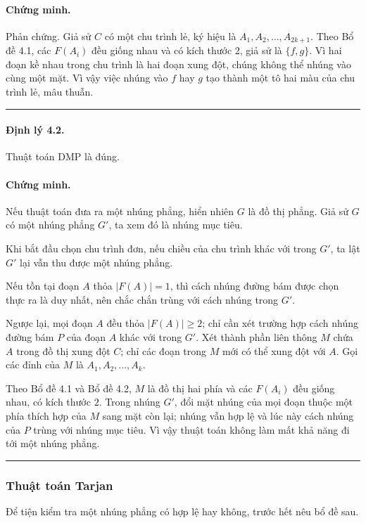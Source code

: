 \documentclass[11pt]{article}
\begin{document}
\paragraph{Chứng minh.}
Phản chứng. Giả sử $C$ có một chu trình lẻ, ký hiệu là
$A_1,A_2,\ldots,A_{2k+1}$. Theo Bổ đề 4.1, các $F(A_i)$ đều giống nhau và có
kích thước $2$, giả sử là $\{f,g\}$. Vì hai đoạn kề nhau trong chu trình là hai
đoạn xung đột, chúng không thể nhúng vào cùng một mặt. Vì vậy việc nhúng vào
$f$ hay $g$ tạo thành một tô hai màu của chu trình lẻ, mâu thuẫn.
\hfill\rule{0.55em}{0.55em}

\paragraph{Định lý 4.2.}
Thuật toán DMP là đúng.

\paragraph{Chứng minh.}
Nếu thuật toán đưa ra một nhúng phẳng, hiển nhiên $G$ là đồ thị phẳng. Giả sử
$G$ có một nhúng phẳng $G'$, ta xem đó là nhúng mục tiêu.

Khi bắt đầu chọn chu trình đơn, nếu chiều của chu trình khác với trong $G'$, ta
lật $G'$ lại vẫn thu được một nhúng phẳng.

Nếu tồn tại đoạn $A$ thỏa $|F(A)|=1$, thì cách nhúng đường bám được chọn thực
ra là duy nhất, nên chắc chắn trùng với cách nhúng trong $G'$.

Ngược lại, mọi đoạn $A$ đều thỏa $|F(A)|\ge 2$; chỉ cần xét trường hợp cách
nhúng đường bám $P$ của đoạn $A$ khác với trong $G'$. Xét thành phần liên thông
$M$ chứa $A$ trong đồ thị xung đột $C$; chỉ các đoạn trong $M$ mới có thể xung
đột với $A$. Gọi các đỉnh của $M$ là $A_1,A_2,\ldots,A_k$.

Theo Bổ đề 4.1 và Bổ đề 4.2, $M$ là đồ thị hai phía và các $F(A_i)$ đều giống
nhau, có kích thước $2$. Trong nhúng $G'$, đổi mặt nhúng của mọi đoạn thuộc
một phía thích hợp của $M$ sang mặt còn lại; nhúng vẫn hợp lệ và lúc này cách
nhúng của $P$ trùng với nhúng mục tiêu. Vì vậy thuật toán không làm mất khả
năng đi tới một nhúng phẳng.
\hfill\rule{0.55em}{0.55em}

\subsubsection{Thuật toán Tarjan}

Để tiện kiểm tra một nhúng phẳng có hợp lệ hay không, trước hết nêu bổ đề sau.
\end{document}
